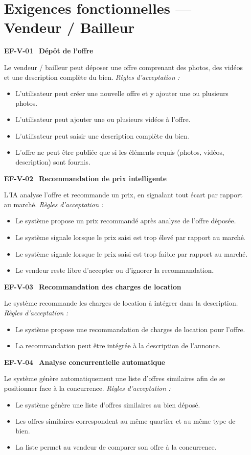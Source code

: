 \documentclass[11pt,a4paper]{article}
\newcommand{\exigence}[2]{%
  \par\vspace{6pt}%
  \noindent\colorbox{light}{%
    \parbox{\dimexpr\textwidth-2\fboxsep}{%
      \textbf{\color{primary}#1} \textemdash\ \textbf{#2}%
    }%
  }\par\vspace{2pt}%
}
\newenvironment{acceptation}
  {\vspace{2pt}\noindent\textit{Règles d'acceptation :}
   \begin{itemize}[leftmargin=1.4em,itemsep=1pt,topsep=2pt]}
  {\end{itemize}\vspace{4pt}}
\begin{document}
\clearpage

\section{Exigences fonctionnelles — Vendeur / Bailleur}

\exigence{EF-V-01}{Dépôt de l'offre}
Le vendeur / bailleur peut déposer une offre comprenant des photos, des
vidéos et une description complète du bien.
\begin{acceptation}
  \item L'utilisateur peut créer une nouvelle offre et y ajouter une ou plusieurs photos.
  \item L'utilisateur peut ajouter une ou plusieurs vidéos à l'offre.
  \item L'utilisateur peut saisir une description complète du bien.
  \item L'offre ne peut être publiée que si les éléments requis (photos, vidéos, description) sont fournis.
\end{acceptation}

\exigence{EF-V-02}{Recommandation de prix intelligente}
L'IA analyse l'offre et recommande un prix, en signalant tout écart par
rapport au marché.
\begin{acceptation}
  \item Le système propose un prix recommandé après analyse de l'offre déposée.
  \item Le système signale lorsque le prix saisi est trop élevé par rapport au marché.
  \item Le système signale lorsque le prix saisi est trop faible par rapport au marché.
  \item Le vendeur reste libre d'accepter ou d'ignorer la recommandation.
\end{acceptation}

\exigence{EF-V-03}{Recommandation des charges de location}
Le système recommande les charges de location à intégrer dans la description.
\begin{acceptation}
  \item Le système propose une recommandation de charges de location pour l'offre.
  \item La recommandation peut être intégrée à la description de l'annonce.
\end{acceptation}

\exigence{EF-V-04}{Analyse concurrentielle automatique}
Le système génère automatiquement une liste d'offres similaires afin de se
positionner face à la concurrence.
\begin{acceptation}
  \item Le système génère une liste d'offres similaires au bien déposé.
  \item Les offres similaires correspondent au même quartier et au même type de bien.
  \item La liste permet au vendeur de comparer son offre à la concurrence.
\end{acceptation}
\end{document}

